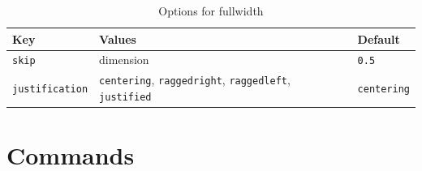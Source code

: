 \documentclass[11pt, twoside, openany]{book}
\begin{document}
\begin{table}
	\centering
	\caption{Options for fullwidth}
	\label{tab:fullwidthoptions}
	\begin{tabular}{lll}
		\textbf{Key}  & \textbf{Values} & \textbf{Default}                 \\
		\hline
		\texttt{skip} & dimension       & \texttt{0.5\string\baselineskip} \\
		\texttt{justification} & \texttt{centering}, \texttt{raggedright},
		\texttt{raggedleft}, \texttt{justified}
		& \texttt{centering} \\
	\end{tabular}
\end{table}

\section{Commands}\label{sec:commands}
\end{document}
